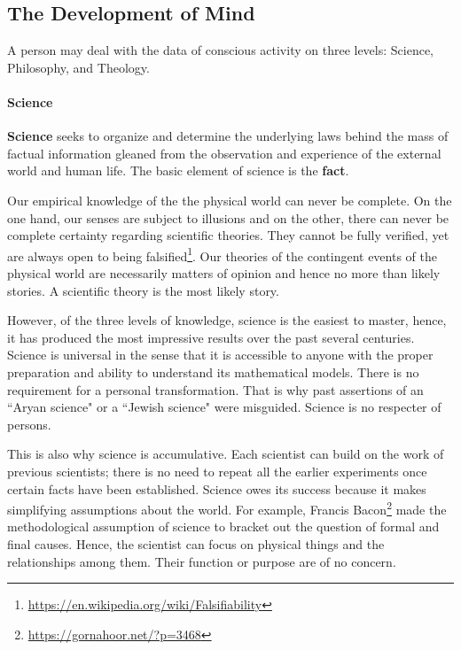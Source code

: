 \subsection{The Development of Mind}

\begin{quotex}
A person may deal with the data of conscious activity on three levels: Science, Philosophy, and Theology.
\end{quotex}

\paragraph{Science}
\textbf{Science} seeks to organize and determine the underlying laws behind the mass of factual information gleaned from the observation and experience of the external world and human life. The basic element of science is the \textbf{fact}.

Our empirical knowledge of the the physical world can never be complete. On the one hand, our senses are subject to illusions and on the other, there can never be complete certainty regarding scientific theories. They cannot be fully verified, yet are always open to being falsified\footnote{\url{https://en.wikipedia.org/wiki/Falsifiability}}. Our theories of the contingent events of the physical world are necessarily matters of opinion and hence no more than likely stories. A scientific theory is the most likely story.

However, of the three levels of knowledge, science is the easiest to master, hence, it has produced the most impressive results over the past several centuries. Science is universal in the sense that it is accessible to anyone with the proper preparation and ability to understand its mathematical models. There is no requirement for a personal transformation. That is why past assertions of an ``Aryan science" or a ``Jewish science" were misguided. Science is no respecter of persons.

This is also why science is accumulative. Each scientist can build on the work of previous scientists; there is no need to repeat all the earlier experiments once certain facts have been established. Science owes its success because it makes simplifying assumptions about the world. For example, Francis Bacon\footnote{\url{https://gornahoor.net/?p=3468}} made the methodological assumption of science to bracket out the question of formal and final causes. Hence, the scientist can focus on physical things and the relationships among them. Their function or purpose are of no concern.

